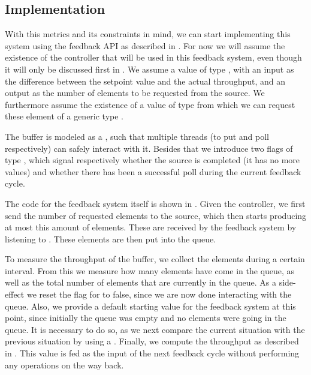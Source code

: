 \subsection*{Implementation}
With this metrics and its constraints in mind, we can start implementing this system using the feedback API as described in . For now we will assume the existence of the controller that will be used in this feedback system, even though it will only be discussed first in . We assume a value  of type , with an input as the difference between the setpoint value and the actual throughput, and an output as the number of elements to be requested from the source. We furthermore assume the existence of a value  of type  from which we can request these element of a generic type .

The buffer is modeled as a , such that multiple threads (to put and poll respectively) can safely interact with it. Besides that we introduce two flags of type , which signal respectively whether the source is completed (it has no more values) and whether there has been a successful poll during the current feedback cycle.

The code for the feedback system itself is shown in . Given the controller, we first send the number of requested elements to the source, which then starts producing at most this amount of elements. These are received by the feedback system by listening to . These elements are then put into the queue.

To measure the throughput of the buffer, we collect the elements during a certain interval. From this we measure how many elements have come in the queue, as well as the total number of elements that are currently in the queue. As a side-effect we reset the flag for  to false, since we are now done interacting with the queue. Also, we provide a default starting value for the feedback system at this point, since initially the queue was empty and no elements were going in the queue. It is necessary to do so, as we next compare the current situation with the previous situation by using a . Finally, we compute the throughput as described in . This value is fed as the input of the next feedback cycle without performing any operations on the way back.

